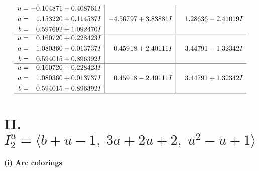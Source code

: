 \documentclass[1p]{elsarticle_modified}
\theoremstyle{definition}
\begin{document}
$$\begin{array}{c|c|c}
\begin{aligned}
u &= -0.104871 - 0.408761 I \\
a &= \phantom{-}1.153220 + 0.114537 I \\
b &= \phantom{-}0.597692 + 1.092470 I\end{aligned}
 & -4.56797 + 3.83881 I & \phantom{-}1.28636 - 2.41019 I \\ \hline\begin{aligned}
u &= \phantom{-}0.160720 + 0.228423 I \\
a &= \phantom{-}1.080360 - 0.013737 I \\
b &= \phantom{-}0.594015 + 0.896392 I\end{aligned}
 & \phantom{-}0.45918 + 2.40111 I & \phantom{-}3.44791 - 1.32342 I \\ \hline\begin{aligned}
u &= \phantom{-}0.160720 - 0.228423 I \\
a &= \phantom{-}1.080360 + 0.013737 I \\
b &= \phantom{-}0.594015 - 0.896392 I\end{aligned}
 & \phantom{-}0.45918 - 2.40111 I & \phantom{-}3.44791 + 1.32342 I\\
 \hline 
 \end{array}$$\newpage\newpage\renewcommand{\arraystretch}{1}
\centering \section*{II. $I^u_{2}= \langle b+u-1,\;3 a+2 u+2,\;u^2- u+1 \rangle$}
\flushleft \textbf{(i) Arc colorings}\\
\end{document}
